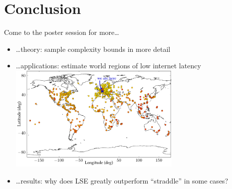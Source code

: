 \documentclass[10pt,mathserif]{beamer}
\newcommand{\acl}{\textsf{LSE}\xspace}
\begin{document}
\section{Conclusion}

\begin{frame}
\begin{center}
\large Come to the poster session for more\ldots
\end{center}
\begin{itemize}
\item<2-> \ldots theory: sample complexity bounds in more detail
\item<3-> \ldots applications: estimate world regions of low internet latency\\[0.5em]
\hspace{3em}\includegraphics[height=2in]{figures/map}
\item<4-> \ldots results: why does \acl greatly outperform ``straddle'' in some cases?
\end{itemize}
\end{frame}
\end{document}
